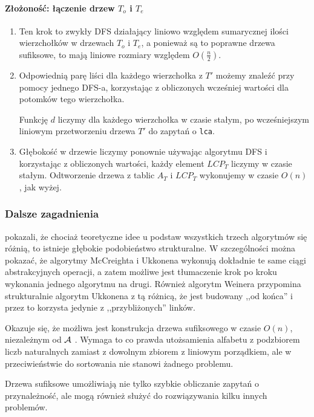 \paragraph{Złożoność: łączenie drzew $T_o$ i $T_e$}
\begin{enumerate}
\item Ten krok to zwykły DFS działający liniowo względem sumarycznej ilości wierzchołków w drzewach $T_o$ i $T_e$, a ponieważ są to poprawne drzewa sufiksowe, to mają liniowe rozmiary względem $O(\frac{n}{2})$.
\item Odpowiednią parę liści dla każdego wierzchołka z $T'$ możemy znaleźć przy pomocy jednego DFS-a, korzystając z obliczonych wcześniej wartości dla potomków tego wierzchołka.

Funkcję $d$ liczymy dla każdego wierzchołka w czasie stałym, po wcześniejszym liniowym przetworzeniu drzewa $T'$ do zapytań o \verb|lca|.
\item Głębokość w drzewie liczymy ponownie używając algorytmu DFS i korzystając z obliczonych wartości, każdy element $LCP_T$ liczymy w czasie stałym. Odtworzenie drzewa z tablic $A_T$ i $LCP_T$ wykonujemy w czasie $O(n)$, jak wyżej.
\end{enumerate}


\subsubsection{Dalsze zagadnienia}

\citet{giegerich1997ukkonen} pokazali, że chociaż teoretyczne idee u podstaw wszystkich trzech algorytmów się różnią, to istnieje głębokie podobieństwo strukturalne. W szczególności można pokazać, że algorytmy McCreighta i Ukkonena wykonują dokładnie te same ciągi abstrakcyjnych operacji, a zatem możliwe jest tłumaczenie krok po kroku wykonania jednego algorytmu na drugi. Również algorytm Weinera przypomina strukturalnie algorytm Ukkonena z tą różnicą, że jest budowany ,,od końca'' i przez to korzysta jedynie z ,,przybliżonych'' linków.

Okazuje się, że możliwa jest konstrukcja drzewa sufiksowego w czasie $O(n)$, niezależnym od $\operatorname{\mathcal{A}}$ \citep{farach1997optimal}. Wymaga to co prawda utożsamienia alfabetu z podzbiorem liczb naturalnych zamiast z dowolnym zbiorem z liniowym porządkiem, ale w przeciwieństwie do sortowania nie stanowi żadnego problemu.

Drzewa sufiksowe umożliwiają nie tylko szybkie obliczanie zapytań o przynależność, ale mogą również służyć do rozwiązywania kilku innych problemów.

